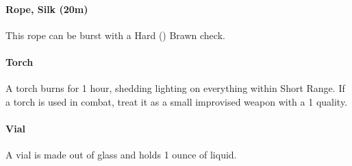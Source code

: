 \begin{multicols}{2}
\paragraph{Rope, Silk (20m)} \label{advitm:rope_silk}
This rope can be burst with a Hard (\difficulty\difficulty\difficulty\setback)
Brawn check.

\paragraph{Torch} \label{advitm:torch}
A torch burns for 1 hour, shedding lighting on
everything within Short Range.
If a torch is used in combat, treat it as a small
improvised weapon with a  1 quality.

\paragraph{Vial} \label{advitm:vial}
A vial is made out of glass and holds 1 ounce of liquid.

\end{multicols}
